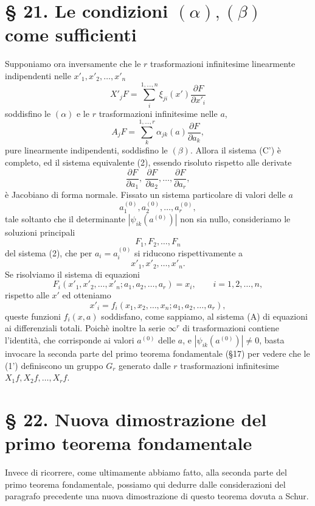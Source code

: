 \documentclass[11pt]{book}
\begin{document}
\section*{\S{} 21. Le condizioni $(\alpha),(\beta)$ come sufficienti}

Supponiamo ora inversamente che le $r$ trasformazioni infinitesime linearmente indipendenti nelle $x'_1,x'_2,\ldots,x'_n$
\[
 X'_jF=\sum\limits_i^{1,\ldots,n}\xi_{ji}(x')\frac{\partial F}{\partial x'_i}
\]
soddisfino le $(\alpha)$ e le $r$ trasformazioni infinitesime nelle $a$,
\[
 A_jF=\sum\limits_k^{1,\ldots,r}\alpha_{jk}(a)\frac{\partial F}{\partial a_k},
\]
pure linearmente indipendenti, soddisfino le $(\beta)$. Allora il sistema (C') è completo, ed il sistema equivalente (2), essendo risoluto rispetto alle derivate
\[
 \frac{\partial F}{\partial a_1},\ \frac{\partial F}{\partial a_2},\ldots,\frac{\partial F}{\partial a_r},
\]
è Jacobiano di forma normale. Fissato un sistema particolare di valori delle $a$
\[
 a_1^{(0)},a_2^{(0)},\ldots,a_r^{(0)},
\]
tale soltanto che il determinante $|\psi_{ik}(a^{(0)})|$ non sia nullo, consideriamo le soluzioni principali
\[
 F_1,F_2,\ldots,F_n
\]
del sistema (2), che per $a_i=a_i^{(0)}$ si riducono rispettivamente a
\[
 x'_1,x'_2,\ldots,x'_n.
\]
Se risolviamo il sistema di equazioni
\[
 F_i(x'_1,x'_2,\ldots,x'_n; a_1,a_2,\ldots,a_r)=x_i,\qquad i=1,2,\ldots,n,
\]
rispetto alle $x'$ ed otteniamo
\begin{equation*}\tag{1'}
 x'_i=f_i(x_1,x_2,\ldots,x_n; a_1,a_2,\ldots,a_r),
\end{equation*}
queste funzioni $f_i(x,a)$ soddisfano, come sappiamo, al sistema (A) di equazioni ai differenziali totali. Poichè inoltre la serie $\infty^r$ di trasformazioni contiene l'identità, che corrisponde ai valori $a^{(0)}$ delle $a$, e $|\psi_{ik}(a^{(0)})|\ne0$, basta invocare la seconda parte del primo teorema fondamentale (\S{}17) per vedere che le (1') definiscono un gruppo $G_r$ generato dalle $r$ trasformazioni infinitesime $X_1f,X_2f,\ldots,X_rf$.

\section*{\S{} 22. Nuova dimostrazione del primo teorema fondamentale}

Invece di ricorrere, come ultimamente abbiamo fatto, alla seconda parte del primo teorema fondamentale, possiamo qui dedurre dalle considerazioni del paragrafo precedente una nuova dimostrazione di questo teorema dovuta a Schur.
\end{document}
